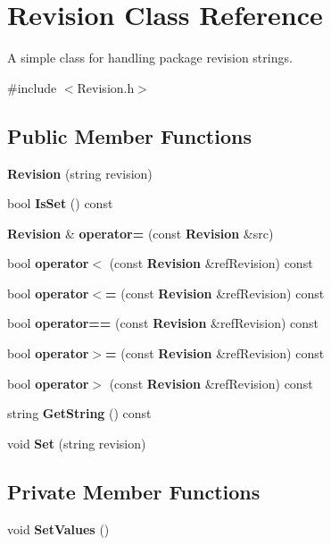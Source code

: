\section{Revision Class Reference}
\label{classRevision}


A simple class for handling package revision strings.  




{\ttfamily \#include $<$Revision.h$>$}

\subsection*{Public Member Functions}
\begin{DoxyCompactItemize}
\item 
{\bf Revision} (string revision)
\item 
bool {\bf IsSet} () const 
\item 
{\bf Revision} \& {\bf operator=} (const {\bf Revision} \&src)
\item 
bool {\bf operator$<$} (const {\bf Revision} \&refRevision) const 
\item 
bool {\bf operator$<$=} (const {\bf Revision} \&refRevision) const 
\item 
bool {\bf operator==} (const {\bf Revision} \&refRevision) const 
\item 
bool {\bf operator$>$=} (const {\bf Revision} \&refRevision) const 
\item 
bool {\bf operator$>$} (const {\bf Revision} \&refRevision) const 
\item 
string {\bf GetString} () const 
\item 
void {\bf Set} (string revision)
\end{DoxyCompactItemize}
\subsection*{Private Member Functions}
\begin{DoxyCompactItemize}
\item 
void {\bf SetValues} ()
\end{DoxyCompactItemize}
